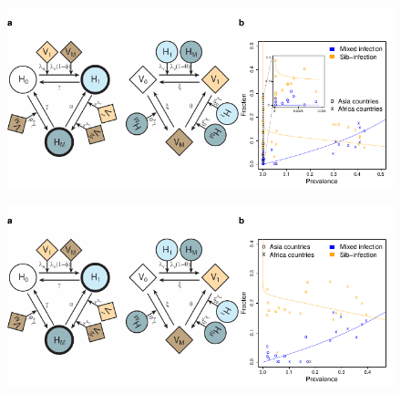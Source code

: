 \documentclass{article}
\begin{document}
\newpage{}
\begin{figure}[htp]
  \begin{center}
  \includegraphics[width=\textwidth]{Fig5.pdf}
   \end{center}
\end{figure}
\newpage{}
\begin{figure}[htp]
  \begin{center}
  \includegraphics[width=\textwidth]{Fig6.pdf}
   \end{center}
\end{figure}
\end{document}
